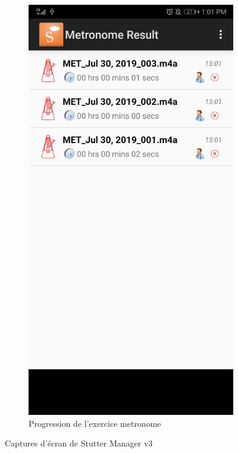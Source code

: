 \begin{appendices}
\begin{landscape}
\begin{figure}[h]
\begin{subfigure}{.25\textwidth}
    \includegraphics[width=.75\linewidth]{content/imgs/old_app_4.jpg}
    \caption{Progression de l'exercice metronome}
  \end{subfigure}
  \caption*{Captures d'écran de Stutter Manager v3}
\end{figure}

\end{landscape}





\end{appendices}
